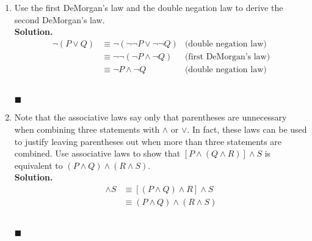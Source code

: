 \documentclass{report}
\newcommand{\sol}{\vspace{1em}\\\textbf{Solution.}\vspace{0.5em}}
\newcommand{\qed}{\ \\\strut\hfill$\blacksquare$\vspace{1em}}
\begin{document}
\begin{enumerate}[leftmargin=*]
\begin{enumerate}
              \item $(P \wedge R) \vee[\neg R \wedge(P \vee Q)]$.
                    \sol{}
                    \begin{align*}
                        (P \wedge R) \vee[\neg R \wedge(P \vee Q)] & \equiv (P \wedge R) \vee (\neg R \wedge P) \vee (\neg R \wedge Q) & \text{(distributive law)} \\
                                                                   & \equiv P \wedge (R \vee \neg R) \vee (\neg R \wedge Q)            & \text{(distributive law)} \\
                                                                   & \equiv P \wedge \top \vee (\neg R \wedge Q)                       & \text{(complement law)}   \\
                                                                   & \equiv P \vee (\neg R \wedge Q)                                   & \text{(identity law)}     \\
                    \end{align*}\vspace{-2em}\qed
          \end{enumerate}

    \item Use the first DeMorgan's law and the double negation law to derive the second
          DeMorgan's law. \sol{}
          \begin{align*}
              \neg(P \vee Q) & \equiv \neg(\neg\neg P \vee \neg\neg Q) & \text{(double negation law)}  \\
                             & \equiv \neg\neg(\neg P \wedge \neg Q)   & \text{(first DeMorgan's law)} \\
                             & \equiv \neg P \wedge \neg Q             & \text{(double negation law)}
          \end{align*} \qed

    \item Note that the associative laws say only that parentheses are unnecessary when
          combining three statements with $\wedge$ or $\vee$. In fact, these laws can be
          used to justify leaving parentheses out when more than three statements are
          combined. Use associative laws to show that $[P \wedge(Q \wedge R)] \wedge S$
          is equivalent to $(P \wedge Q) \wedge(R \wedge S)$. \sol{}
          \begin{align*}
              [P \wedge(Q \wedge R)] \wedge S & \equiv [(P \wedge Q) \wedge R] \wedge S \\
                                              & \equiv (P \wedge Q) \wedge (R \wedge S)
          \end{align*} \qed


\end{enumerate}
\end{document}
